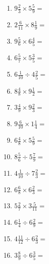 \documentclass[12pt]{article}
\begin{document}
\begin{enumerate}
\item \large $ 9 \frac{2}{3} \times 5 \frac{5}{9} = $ \vspace{1.6cm}
\item \large $ 2 \frac{6}{11} \times 8 \frac{1}{9} = $ \vspace{1.6cm}
\item \large $ 9 \frac{5}{6} \times 6 \frac{4}{5} = $ \vspace{1.6cm}
\item \large $ 6 \frac{5}{7} \times 5 \frac{3}{5} = $ \vspace{1.6cm}
\item \large $ 6 \frac{1}{10} \div 4 \frac{2}{5} = $ \vspace{1.6cm}
\item \large $ 8 \frac{4}{8} \times 9 \frac{1}{2} = $ \vspace{1.6cm}
\newpage
\item \large $ 3 \frac{4}{9} \times 9 \frac{2}{3} = $ \vspace{1.6cm}
\item \large $ 9 \frac{6}{10} \times 1 \frac{1}{4} = $ \vspace{1.6cm}
\item \large $ 6 \frac{4}{8} \times 5 \frac{5}{9} = $ \vspace{1.6cm}
\item \large $ 8 \frac{5}{6} \div 5 \frac{7}{9} = $ \vspace{1.6cm}
\item \large $ 4 \frac{1}{10} \div 7 \frac{2}{3} = $ \vspace{1.6cm}
\item \large $ 6 \frac{6}{8} \times 6 \frac{2}{3} = $ \vspace{1.6cm}
\item \large $ 5 \frac{2}{7} \times 3 \frac{5}{11} = $ \vspace{1.6cm}
\item \large $ 6 \frac{1}{4} \div 6 \frac{2}{9} = $ \vspace{1.6cm}
\item \large $ 4 \frac{11}{12} \div 6 \frac{2}{3} = $ \vspace{1.6cm}
\item \large $ 3 \frac{8}{9} \div 6 \frac{3}{5} = $ \vspace{1.6cm}
\end{enumerate}
\newpage
\end{document}
